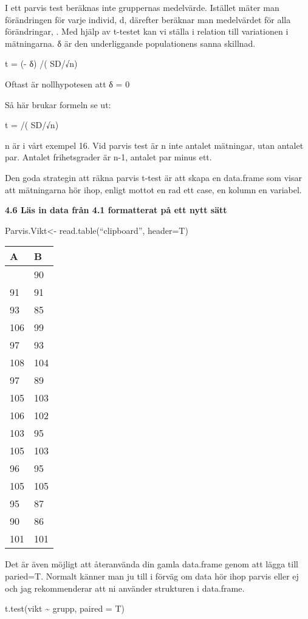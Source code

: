 \documentclass[
  letterpaper,
  DIV=11,
  numbers=noendperiod]{scrartcl}
\begin{document}
I ett parvis test beräknas inte gruppernas medelvärde. Istället mäter
man förändringen för varje individ, d, därefter beräknar man medelvärdet
för alla förändringar, . Med hjälp av t-testet kan vi ställa i relation
till variationen i mätningarna. δ är den underliggande populationens
sanna skillnad.

t = (- δ) /( SD/√n)

Oftast är nollhypotesen att δ = 0

Så här brukar formeln se ut:

t = /( SD/√n)

n är i vårt exempel 16. Vid parvis test är n inte antalet mätningar,
utan antalet par. Antalet frihetsgrader är n-1, antalet par minus ett.

Den goda strategin att räkna parvis t-test är att skapa en data.frame
som visar att mätningarna hör ihop, enligt mottot en rad ett case, en
kolumn en variabel.

\textbf{4.6 Läs in data från 4.1 formatterat på ett nytt sätt}

Parvis.Vikt\textless- read.table(``clipboard'', header=T)

\begin{longtable}[]{@{}ll@{}}
\toprule\noalign{}
A & B \\
\midrule\noalign{}
\endhead
\bottomrule\noalign{}
\endlastfoot
90 & 90 \\
91 & 91 \\
93 & 85 \\
106 & 99 \\
97 & 93 \\
108 & 104 \\
97 & 89 \\
105 & 103 \\
106 & 102 \\
103 & 95 \\
105 & 103 \\
96 & 95 \\
105 & 105 \\
95 & 87 \\
90 & 86 \\
101 & 101 \\
\end{longtable}

Det är även möjligt att återanvända din gamla data.frame genom att lägga
till paried=T. Normalt känner man ju till i förväg om data hör ihop
parvis eller ej och jag rekommenderar att ni använder strukturen i
data.frame.

t.test(vikt \textasciitilde{} grupp, paired = T)
\end{document}
